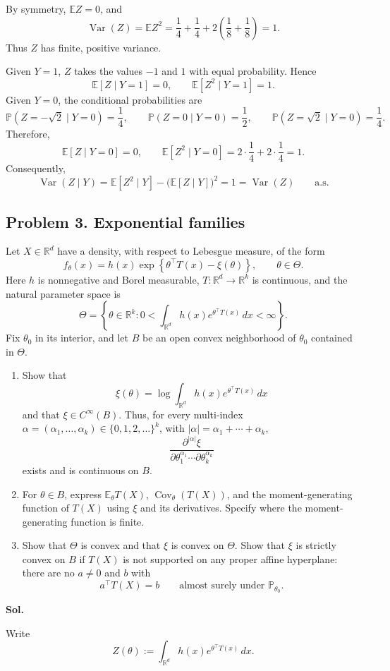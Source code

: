 \documentclass[lang=en,11pt,a4paper,citestyle=authoryear]{elegantpaper}
\newcommand{\R}{\mathbb{R}}
\newcommand{\E}{\mathbb{E}}
\renewcommand{\P}{\mathbb{P}}
\begin{document}
By symmetry, $\E Z=0$, and
\[
\operatorname{Var}(Z)=\E Z^2
=\frac14+\frac14
+2\left(\frac18+\frac18\right)=1.
\]
Thus $Z$ has finite, positive variance.

Given $Y=1$, $Z$ takes the values $-1$ and $1$ with equal
probability. Hence
\[
\E[Z\mid Y=1]=0,\qquad
\E[Z^2\mid Y=1]=1.
\]
Given $Y=0$, the conditional probabilities are
\[
\P(Z=-\sqrt{2}\mid Y=0)=\frac14,\qquad
\P(Z=0\mid Y=0)=\frac12,\qquad
\P(Z=\sqrt{2}\mid Y=0)=\frac14.
\]
Therefore,
\[
\E[Z\mid Y=0]=0,\qquad
\E[Z^2\mid Y=0]
=2\cdot\frac14+2\cdot\frac14=1.
\]
Consequently,
\[
\operatorname{Var}(Z\mid Y)
=\E[Z^2\mid Y]-\bigl(\E[Z\mid Y]\bigr)^2
=1
=\operatorname{Var}(Z)
\qquad\text{a.s.}
\]

\subsection*{Problem 3. Exponential families}
Let $X\in\R^d$ have a density, with respect to Lebesgue measure, of the form
\[
f_\theta(x)
=h(x)\exp\!\left\{\theta^\top T(x)-\xi(\theta)\right\},
\qquad \theta\in\Theta.
\]
Here $h$ is nonnegative and Borel measurable,
$T:\R^d\to\R^k$ is continuous, and the natural parameter space is
\[
\Theta
=
\left\{
\theta\in\R^k:
0<\int_{\R^d}h(x)e^{\theta^\top T(x)}\,dx<\infty
\right\}.
\]
Fix $\theta_0$ in its interior, and let $B$ be an open convex neighborhood
of $\theta_0$ contained in $\Theta$.

\begin{enumerate}[label=(\arabic*),leftmargin=*]
\item Show that
\[
\xi(\theta)
=\log\int_{\R^d}h(x)e^{\theta^\top T(x)}\,dx
\]
and that $\xi\in C^\infty(B)$. Thus, for every multi-index
$\alpha=(\alpha_1,\ldots,\alpha_k)\in\{0,1,2,\ldots\}^k$, with
$|\alpha|=\alpha_1+\cdots+\alpha_k$,
\[
\frac{\partial^{|\alpha|}\xi}
{\partial\theta_1^{\alpha_1}\cdots\partial\theta_k^{\alpha_k}}
\]
exists and is continuous on $B$.

\item For $\theta\in B$, express $\E_\theta T(X)$,
$\operatorname{Cov}_\theta(T(X))$, and the moment-generating function of
$T(X)$ using $\xi$ and its derivatives. Specify where the
moment-generating function is finite.

\item Show that $\Theta$ is convex and that $\xi$ is convex on $\Theta$.
Show that $\xi$ is strictly convex on $B$ if $T(X)$ is not supported on any
proper affine hyperplane: there are no $a\ne0$ and $b$ with
\[
a^\top T(X)=b
\qquad\text{almost surely under }\P_{\theta_0}.
\]
\end{enumerate}
\textbf{Sol.}\par
Write
\[
Z(\theta)
:=
\int_{\R^d}h(x)e^{\theta^\top T(x)}\,dx.
\]
\end{document}
